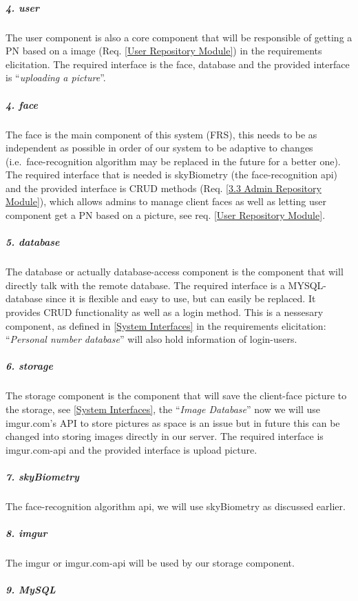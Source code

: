 \documentclass[a4paper,11pt]{article}
\begin{document}
\subparagraph{4. user}\label{user}

The user component is also a core component that will be responsible of
getting a PN based on a image (Req. \ref{User Repository Module}) in the requirements elicitation. The required
interface is the face, database and the provided interface is
``\emph{uploading a picture}''. 

\subparagraph{4. face}\label{face}

The face is the main component of this system (FRS), this needs to be as
independent as possible in order of our system to be adaptive to changes
(i.e.~face-recognition algorithm may be replaced in the future for a
better one). The required interface that is needed is skyBiometry (the
face-recognition api) and the provided interface is CRUD methods (Req. \ref{3.3 Admin Repository Module}), which
allows admins to manage client faces as well as letting user component
get a PN based on a picture, see req. \ref{User Repository Module}.

\subparagraph{5. database}\label{database}

The database or actually database-access component is the component that
will directly talk with the remote database. The required interface is a
MYSQL-database since it is flexible and easy to use, but can easily be replaced. It provides CRUD functionality as well as a login method. This is a nessesary component, as defined in \ref{System Interfaces} in the requirements elicitation: ``\emph{Personal number database}'' will also hold information of login-users.

\subparagraph{6. storage}\label{storage}

The storage component is the component that will save the client-face
picture to the storage, see \ref{System Interfaces}, the ``\emph{Image Database}'' now we will use imgur.com's API to store pictures
as space is an issue but in future this can be changed into storing
images directly in our server. The required interface is imgur.com-api
and the provided interface is upload picture.

\subparagraph{7. skyBiometry}\label{skybiometry}

The face-recognition algorithm api, we will use skyBiometry as discussed
earlier.

\subparagraph{8. imgur}\label{imgur}

The imgur or imgur.com-api will be used by our storage component.

\subparagraph{9. MySQL}\label{mysql}
\end{document}
